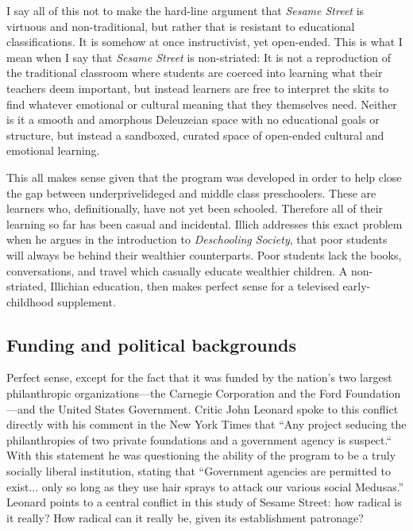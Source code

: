 \documentclass[12pt,letterpaper]{article}
\begin{document}
	I say all of this not to make the hard-line argument that \textit{Sesame
	Street} is virtuous and non-traditional, but rather that is  
	resistant to educational classifications.
	It is somehow at once instructivist, yet open-ended. This
	is what I mean when I say that \textit{Sesame Street} is non-striated: 
	It is not a reproduction of the traditional classroom where students are
	coerced into learning what their teachers deem important, but instead 
	learners are free to interpret the skits to find whatever emotional or 
	cultural meaning that they themselves need. Neither is it a smooth 
	and amorphous Deleuzeian space with no educational goals or structure, 
	but 
	instead a sandboxed, curated space of open-ended cultural and 
	emotional learning.

	This all makes sense given that the program was developed in order to 
	help close the gap between underprivelideged and middle class 
	preschoolers\autocite[sec. 1]{Cooney}. These are learners who, 
	definitionally, have not yet been schooled. Therefore all of their 
	learning so far has been casual and incidental. Illich addresses this 
	exact problem when he argues in the introduction to \textit{Deschooling
	Society}, that poor students will always be behind their wealthier
	counterparts\autocite[5]{Illich}. Poor students lack the books, 
	conversations, and travel which casually educate wealthier children.
	A non-striated, Illichian education, then makes perfect sense for
	a televised early-childhood supplement.

	\subsection*{Funding and political backgrounds}

	Perfect sense, except for the fact that it was funded by the nation’s 
	two largest philanthropic organizations—the Carnegie Corporation and 
	the Ford Foundation—and the United States Government. Critic John 
	Leonard spoke to this conflict directly with his comment in the New 
	York Times that ``Any project seducing the philanthropies of two private
	foundations and a government agency is suspect.``
	With this statement he was questioning the ability of the program to be
	a truly socially liberal institution, stating that ``Government agencies
	are permitted to exist... only so long as they use hair sprays to 
	attack our various social Medusas.'' \autocite[146]{Davis} Leonard 
	points to a central conflict in this study of Sesame Street: how radical
	is it really? How radical can it really be, given its establishment 
	patronage?
\end{document}

